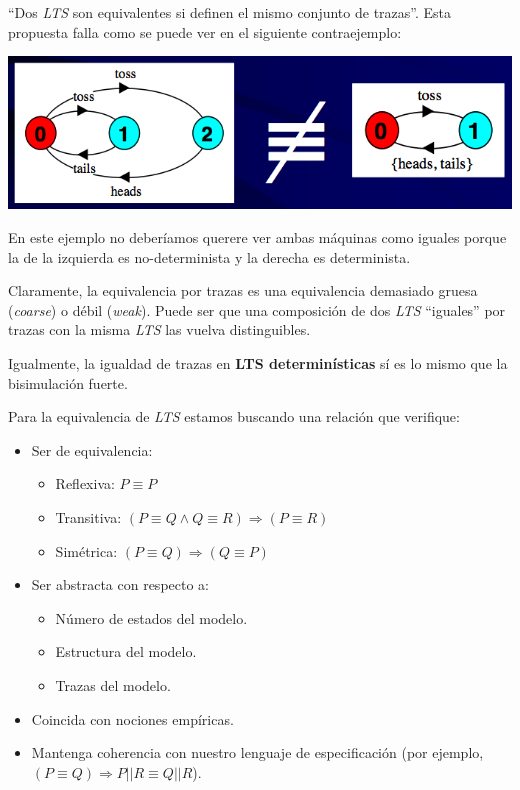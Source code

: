 \documentclass[]{article}
\begin{document}
\label{trazfail}
``Dos \textit{LTS} son equivalentes si definen el mismo conjunto de trazas''. Esta propuesta falla como se puede ver en el siguiente contraejemplo:
\begin{center}
	\includegraphics[scale=0.5]{TrazFail.png}
\end{center}

En este ejemplo no deberíamos querere ver ambas máquinas como iguales porque la de la izquierda es no-determinista y la derecha es determinista.


Claramente, la equivalencia por trazas es una equivalencia demasiado gruesa (\textit{coarse}) o débil (\textit{weak}). Puede ser que una composición de dos \textit{LTS} ``iguales'' por trazas con la misma \textit{LTS} las vuelva distinguibles.

Igualmente, la igualdad de trazas en \textbf{LTS determinísticas} sí es lo mismo que la bisimulación fuerte.


Para la equivalencia de \textit{LTS} estamos buscando una relación que verifique:
\begin{itemize}
	\item Ser de equivalencia:
	\begin{itemize}
		\item Reflexiva: $P \equiv P$
		\item Transitiva: $(P \equiv Q \wedge Q \equiv R) \Rightarrow (P \equiv R)$
		\item Simétrica: $(P \equiv Q) \Rightarrow (Q \equiv P)$
	\end{itemize}
	\item Ser abstracta con respecto a:
	\begin{itemize}
		\item Número de estados del modelo.
		\item Estructura del modelo.
		\item Trazas del modelo.
	\end{itemize}
	\item Coincida con nociones empíricas.
	\item Mantenga coherencia con nuestro lenguaje de especificación (por ejemplo, $(P \equiv Q) \Rightarrow P||R \equiv Q||R$).
\end{itemize}
\end{document}
